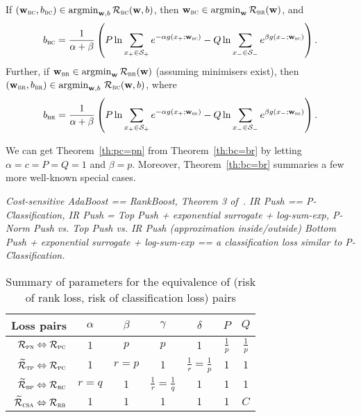 \begin{theorem}
\label{th:bc=br}
If $(\mathbf{w}_\textsc{bc}, b_\textsc{bc}) \in \operatorname*{argmin}_{\mathbf{w},b} \mathcal{R}_\textsc{bc}(\mathbf{w}, b)$,
then $\mathbf{w}_\textsc{bc} \in \operatorname*{argmin}_{\mathbf{w}} \mathcal{R}_\textsc{br}(\mathbf{w})$, and
$$
\displaystyle
b_\textsc{bc} 
= \frac{1}{\alpha + \beta} \left( 
  P \ln \sum_{x_+ \in \mathcal{S}_+} e^{-\alpha g(x_+; \mathbf{w}_\textsc{bc})} -
  Q \ln \sum_{x_- \in \mathcal{S}_-} e^{  \beta g(x_-; \mathbf{w}_\textsc{bc})} \right).
$$
Further, if $\mathbf{w}_\textsc{br} \in \operatorname*{argmin}_{\mathbf{w}} \mathcal{R}_\textsc{br}(\mathbf{w})$ (assuming minimisers exist),
then $(\mathbf{w}_\textsc{br}, b_\textsc{br}) \in \operatorname*{argmin}_{\mathbf{w},b} \, \mathcal{R}_\textsc{bc}(\mathbf{w}, b)$, where
$$
\displaystyle
b_\textsc{br} 
= \frac{1}{\alpha + \beta} \left( 
  P \ln \sum_{x_+ \in \mathcal{S}_+} e^{-\alpha g(x_+; \mathbf{w}_\textsc{br})} -
  Q \ln \sum_{x_- \in \mathcal{S}_-} e^{  \beta g(x_-; \mathbf{w}_\textsc{br})} \right).
$$
\end{theorem}

We can get Theorem~\ref{th:pc=pn} from Theorem~\ref{th:bc=br} by letting $\alpha=c=P=Q=1$ and $\beta=p$.
Moreover, Theorem~\ref{th:bc=br} summaries a few more well-known special cases.

\TODO

{\it Cost-sensitive AdaBoost == RankBoost, Theorem 3 of~\cite{ertekin2011equivalence}.
IR Push == P-Classification,
IR Push = Top Push + exponential surrogate + log-sum-exp, P-Norm Push vs. Top Push vs. IR Push (approximation inside/outside)
Bottom Push + exponential surrogate + log-sum-exp == a classification loss similar to P-Classification.
}

\begin{table}[!h]
\centering
\caption{Summary of parameters for the equivalence of (risk of rank loss, risk of classification loss) pairs}
\label{tab:config}
\begin{tabular}{r*{6}{c}}
\toprule
{\bf Loss pairs}                                         & $\alpha$ & $\beta$ & $\gamma$ & $\delta$ & $P$ & $Q$ \\ \hline
$\mathcal{R}_\textsc{pn} \Leftrightarrow \mathcal{R}_\textsc{pc}$            & $1$      & $p$     & $p$      & $1$      & $\frac{1}{p}$ & $\frac{1}{p}$ \\
$\widetilde{\mathcal{R}}_\textsc{tp} \Leftrightarrow \mathcal{R}_\textsc{pc}$  & $1$      & $r=p$   & $1$      & $\frac{1}{r}=\frac{1}{p}$ & $1$ & $1$ \\
$\widetilde{\mathcal{R}}_\textsc{bp} \Leftrightarrow \mathcal{R}_\textsc{rc}$  & $r=q$    & $1$     & $\frac{1}{r}=\frac{1}{q}$ & $1$ & $1$ & $1$ \\
$\widetilde{\mathcal{R}}_\textsc{csa} \Leftrightarrow \mathcal{R}_\textsc{rb}$ & $1$      & $1$     & $1$      & $1$      & $1$ & $C$ \\
\bottomrule
\end{tabular}
\end{table}
